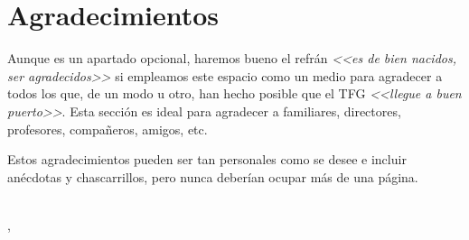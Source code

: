 \ifspanish
\else
\fi

%
%
\cleardoublepage
{} %

\chapter*{Agradecimientos} %

 Aunque es un apartado opcional, haremos bueno el refrán \emph{<<es de bien nacidos, ser agradecidos>>} si empleamos este espacio como un medio para agradecer a todos los que, de un modo u otro, han hecho posible que el TFG \emph{<<llegue a buen puerto>>}. Esta sección es ideal para agradecer a familiares, directores, profesores, compañeros, amigos, etc. 
 
 Estos agradecimientos pueden ser tan personales como se desee e incluir anécdotas y chascarrillos, pero nunca deberían ocupar más de una página.

\makeatletter		
\begin{flushright}
	\vspace{1,5cm}
	\textit{\@autor}\\
	\@lugarDef, \@yearDef
\end{flushright}
\makeatother